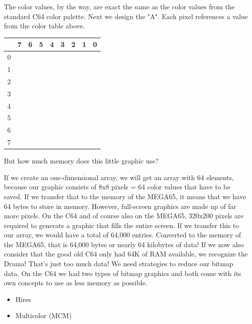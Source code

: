 The color values, by the way, are exact the same as the color values from the standard C64 color palette. Next we design the "A". Each pixel references a value from the color table above.


\begin{center}
\begin{tabular}{|m{6pt}|m{6pt}m{6pt}m{6pt}m{6pt}m{6pt}m{5pt}m{6pt}m{6pt}|}
\hline
	& 7 & 6 & 5 & 4 & 3 & 2 & 1 & 0 \\
\hline
	0 & \blkb & \blkb & \blkb & \blkb & \blkb & \blkb & \blkb & \blkb \\
	1 & \red & \lgr & \yel & \lgr & \red & \ora & \blkb & \blkb \\
	2 & \lgr & \lgr & \blkb & \blkb & \ora & \red & \blkb & \blkb \\
	3 & \yel & \yel & \blkb & \blkb & \ora & \red & \blkb & \blkb \\
	4 & \yel & \lgr & \lgr & \red & \red & \red & \blkb & \blkb \\
	5 & \lgr & \red & \blkb & \blkb & \ora & \red & \blkb & \blkb \\
	6 & \red & \red & \blkb & \blkb & \red & \red & \blkb & \blkb \\
	7 & \ora & \bwn & \blkb & \blkb & \ora & \red & \blkb & \blkb \\
\hline
\end{tabular}
\end{center}

But how much memory does this little graphic use?

If we create an one-dimensional array, we will get an array with 64 elements, because our graphic consists of 8x8 pixels = 64 color values that have to be saved. If we transfer that to the memory of the MEGA65, it means that we have 64 bytes to store in memory. However, full-screen graphics are made up of far more pixels. On the C64 and of course also on the MEGA65, 320x200 pixels are required to generate a graphic that fills the entire screen. If we transfer this to our array, we would have a total of 64,000 entries. Converted to the memory of the MEGA65, that is 64,000 bytes or nearly 64 kilobytes of data! If we now also consider that the good old C64 only had 64K of RAM available, we recognize the Drama! That's just too much data! We need strategies to reduce our bitmap data. On the C64 we had two types of bitmap graphics and both come with its own concepts to use as less memory as possible.

\begin{itemize}
	\item Hires
	\item Multicolor (MCM)
\end{itemize}



